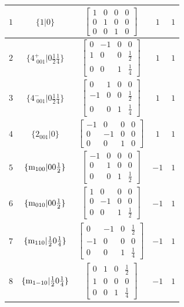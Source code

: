 \documentclass[fleqn,8pt]{jsarticle}
\begin{document}
\begin{longtable}{ccccc}
$ 1 $ & $ \{1|0\} $ & $ \begin{bmatrix} 1 & 0 & 0 & 0 \\ 0 & 1 & 0 & 0 \\ 0 & 0 & 1 & 0 \end{bmatrix} $ & $ 1 $ & $ 1 $ \\ \hline
$ 2 $ & $ \{4^{+}_{\,\,001}|0 \frac{1}{2} \frac{1}{4}\} $ & $ \begin{bmatrix} 0 & -1 & 0 & 0 \\ 1 & 0 & 0 & \frac{1}{2} \\ 0 & 0 & 1 & \frac{1}{4} \end{bmatrix} $ & $ 1 $ & $ 1 $ \\ \hline
$ 3 $ & $ \{4^{-}_{\,\,001}|0 \frac{1}{2} \frac{1}{4}\} $ & $ \begin{bmatrix} 0 & 1 & 0 & 0 \\ -1 & 0 & 0 & \frac{1}{2} \\ 0 & 0 & 1 & \frac{1}{4} \end{bmatrix} $ & $ 1 $ & $ 1 $ \\ \hline
$ 4 $ & $ \{2{}_{001}|0\} $ & $ \begin{bmatrix} -1 & 0 & 0 & 0 \\ 0 & -1 & 0 & 0 \\ 0 & 0 & 1 & 0 \end{bmatrix} $ & $ 1 $ & $ 1 $ \\ \hline
$ 5 $ & $ \{{\rm m}_{100}|0 0 \frac{1}{2}\} $ & $ \begin{bmatrix} -1 & 0 & 0 & 0 \\ 0 & 1 & 0 & 0 \\ 0 & 0 & 1 & \frac{1}{2} \end{bmatrix} $ & $ -1 $ & $ 1 $ \\ \hline
$ 6 $ & $ \{{\rm m}_{010}|0 0 \frac{1}{2}\} $ & $ \begin{bmatrix} 1 & 0 & 0 & 0 \\ 0 & -1 & 0 & 0 \\ 0 & 0 & 1 & \frac{1}{2} \end{bmatrix} $ & $ -1 $ & $ 1 $ \\ \hline
$ 7 $ & $ \{{\rm m}_{110}|\frac{1}{2} 0 \frac{1}{4}\} $ & $ \begin{bmatrix} 0 & -1 & 0 & \frac{1}{2} \\ -1 & 0 & 0 & 0 \\ 0 & 0 & 1 & \frac{1}{4} \end{bmatrix} $ & $ -1 $ & $ 1 $ \\ \hline
$ 8 $ & $ \{{\rm m}_{1-10}|\frac{1}{2} 0 \frac{1}{4}\} $ & $ \begin{bmatrix} 0 & 1 & 0 & \frac{1}{2} \\ 1 & 0 & 0 & 0 \\ 0 & 0 & 1 & \frac{1}{4} \end{bmatrix} $ & $ -1 $ & $ 1 $ \\ \hline

\end{longtable}
\end{document}
